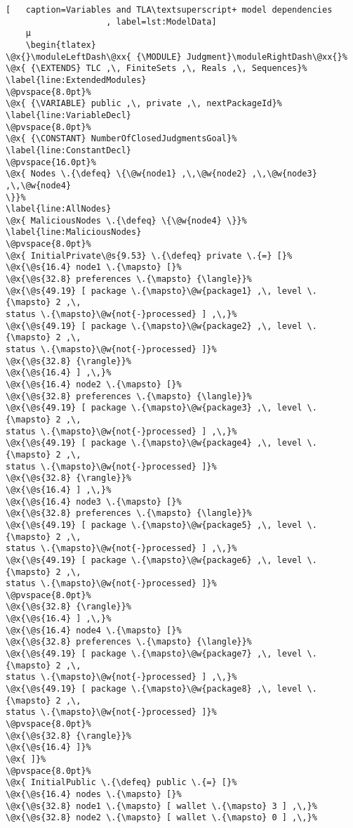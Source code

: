 \begin{lstlisting}[	  caption=Variables and TLA\textsuperscript+ model dependencies
					, label=lst:ModelData]
	µ
	\begin{tlatex}
\@x{}\moduleLeftDash\@xx{ {\MODULE} Judgment}\moduleRightDash\@xx{}%
\@x{ {\EXTENDS} TLC ,\, FiniteSets ,\, Reals ,\, Sequences}%
\label{line:ExtendedModules}
\@pvspace{8.0pt}%
\@x{ {\VARIABLE} public ,\, private ,\, nextPackageId}%
\label{line:VariableDecl}
\@pvspace{8.0pt}%
\@x{ {\CONSTANT} NumberOfClosedJudgmentsGoal}%
\label{line:ConstantDecl}
\@pvspace{16.0pt}%
\@x{ Nodes \.{\defeq} \{\@w{node1} ,\,\@w{node2} ,\,\@w{node3} ,\,\@w{node4}
\}}%
\label{line:AllNodes}
\@x{ MaliciousNodes \.{\defeq} \{\@w{node4} \}}%
\label{line:MaliciousNodes}
\@pvspace{8.0pt}%
\@x{ InitialPrivate\@s{9.53} \.{\defeq} private \.{=} [}%
\@x{\@s{16.4} node1 \.{\mapsto} [}%
\@x{\@s{32.8} preferences \.{\mapsto} {\langle}}%
\@x{\@s{49.19} [ package \.{\mapsto}\@w{package1} ,\, level \.{\mapsto} 2 ,\,
status \.{\mapsto}\@w{not{-}processed} ] ,\,}%
\@x{\@s{49.19} [ package \.{\mapsto}\@w{package2} ,\, level \.{\mapsto} 2 ,\,
status \.{\mapsto}\@w{not{-}processed} ]}%
\@x{\@s{32.8} {\rangle}}%
\@x{\@s{16.4} ] ,\,}%
\@x{\@s{16.4} node2 \.{\mapsto} [}%
\@x{\@s{32.8} preferences \.{\mapsto} {\langle}}%
\@x{\@s{49.19} [ package \.{\mapsto}\@w{package3} ,\, level \.{\mapsto} 2 ,\,
status \.{\mapsto}\@w{not{-}processed} ] ,\,}%
\@x{\@s{49.19} [ package \.{\mapsto}\@w{package4} ,\, level \.{\mapsto} 2 ,\,
status \.{\mapsto}\@w{not{-}processed} ]}%
\@x{\@s{32.8} {\rangle}}%
\@x{\@s{16.4} ] ,\,}%
\@x{\@s{16.4} node3 \.{\mapsto} [}%
\@x{\@s{32.8} preferences \.{\mapsto} {\langle}}%
\@x{\@s{49.19} [ package \.{\mapsto}\@w{package5} ,\, level \.{\mapsto} 2 ,\,
status \.{\mapsto}\@w{not{-}processed} ] ,\,}%
\@x{\@s{49.19} [ package \.{\mapsto}\@w{package6} ,\, level \.{\mapsto} 2 ,\,
status \.{\mapsto}\@w{not{-}processed} ]}%
\@pvspace{8.0pt}%
\@x{\@s{32.8} {\rangle}}%
\@x{\@s{16.4} ] ,\,}%
\@x{\@s{16.4} node4 \.{\mapsto} [}%
\@x{\@s{32.8} preferences \.{\mapsto} {\langle}}%
\@x{\@s{49.19} [ package \.{\mapsto}\@w{package7} ,\, level \.{\mapsto} 2 ,\,
status \.{\mapsto}\@w{not{-}processed} ] ,\,}%
\@x{\@s{49.19} [ package \.{\mapsto}\@w{package8} ,\, level \.{\mapsto} 2 ,\,
status \.{\mapsto}\@w{not{-}processed} ]}%
\@pvspace{8.0pt}%
\@x{\@s{32.8} {\rangle}}%
\@x{\@s{16.4} ]}%
\@x{ ]}%
\@pvspace{8.0pt}%
\@x{ InitialPublic \.{\defeq} public \.{=} [}%
\@x{\@s{16.4} nodes \.{\mapsto} [}%
\@x{\@s{32.8} node1 \.{\mapsto} [ wallet \.{\mapsto} 3 ] ,\,}%
\@x{\@s{32.8} node2 \.{\mapsto} [ wallet \.{\mapsto} 0 ] ,\,}%

\end{lstlisting}
